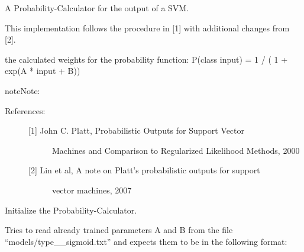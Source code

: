 \documentclass[letterpaper,10pt,english]{sphinxmanual}
\begin{document}
\begin{fulllineitems}
\label{\detokenize{api:probability.Probability}}
A Probability-Calculator for the output of a SVM.

This implementation follows the procedure in {[}1{]} with additional
changes from {[}2{]}.


\begin{fulllineitems}
the calculated weights for the probability function:
P(class \textbar{} input) = 1 / ( 1 + exp(A * input + B))

\end{fulllineitems}


\begin{sphinxadmonition}{note}{Note:}\begin{description}
\item[{References:}] \leavevmode\begin{description}
\item[{{[}1{]} John C. Platt, Probabilistic Outputs for Support Vector}] \leavevmode
Machines and Comparison to Regularized Likelihood Methods, 2000

\item[{{[}2{]} Lin et al, A note on Platt’s probabilistic outputs for support}] \leavevmode
vector machines, 2007

\end{description}

\end{description}
\end{sphinxadmonition}

\begin{fulllineitems}
\label{\detokenize{api:probability.Probability.__init__}}
Initialize the Probability-Calculator.

Tries to read already trained parameters A and B from the file
“models/type\_\_sigmoid.txt” and expects them to be in the following
format:

%
\begin{sphinxVerbatim}[commandchars=\\\{\}]
 
 
\end{sphinxVerbatim}


\end{fulllineitems}
\end{fulllineitems}
\end{document}
